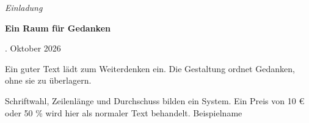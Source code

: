 \documentclass[12pt,a4paper,ngerman,DIV=12,BCOR=0mm,oneside]{scrartcl}
\newcommand{\datenschrift}{\sffamily\small\firalining\firatabular}
\begin{document}
\RaggedRight
\begin{center}
{\normalsize\itshape Einladung\par}
\bigskip
{\LARGE\bfseries Ein Raum für Gedanken\par}
\bigskip
{\datenschrift 19. Oktober 2026}
\end{center}
\bigskip
Ein guter Text lädt zum Weiterdenken ein. Die Gestaltung ordnet Gedanken, ohne sie zu überlagern.

Schriftwahl, Zeilenlänge und Durchschuss bilden ein System. Ein Preis von 10 € oder 50 \% wird hier als normaler Text behandelt.
\bigskip
Beispielname
\end{document}
